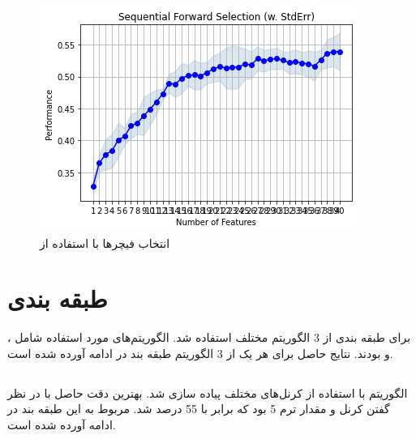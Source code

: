 \begin{figure}[h!]
    \centering
    \includegraphics[width=1\linewidth]{images/feature_selection.png}
    \caption{انتخاب فیچرها با استفاده از }
    \label{fig:feature_selection}
\end{figure}



\section{طبقه بندی}

برای طبقه بندی از 3 الگوریتم مختلف استفاده شد. الگوریتم‌های مورد استفاده شامل ،  و  بودند.
نتایج حاصل برای هر یک از 3 الگوریتم طبقه بند در ادامه آورده شده است.
\subsection{}
الگوریتم  با استفاده از کرنل‌های مختلف پیاده سازی شد. بهترین دقت حاصل 
با در نظر گفتن کرنل  و مقدار ترم  5 بود که برابر با 55 درصد شد.
 مربوط به این طبقه بند در ادامه آورده شده است.

